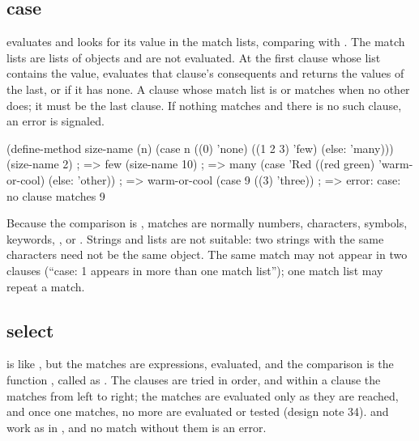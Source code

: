 \subsection{case}

\begin{quote}
\end{quote}

\noindent {} evaluates  and looks for its value in the
match lists, comparing with . The match lists are lists of
objects and are not evaluated. At the first clause whose list contains the
value,  evaluates that clause's consequents and returns the
values of the last, or  if it has none. A clause whose match list
is  or  matches when no other does; it must be the last
clause. If nothing matches and there is no such clause, an error is
signaled.

\begin{dylan}
(define-method size-name (n)
  (case n
    ((0) 'none)
    ((1 2 3) 'few)
    (else: 'many)))
(size-name 2)            ; => few
(size-name 10)           ; => many
(case 'Red ((red green) 'warm-or-cool) (else: 'other))   ; => warm-or-cool
(case 9 ((3) 'three))    ; => error: case: no clause matches 9
\end{dylan}

\noindent Because the comparison is , matches are normally
numbers, characters, symbols, keywords, ,  or
\code{()}. Strings and lists are not suitable: two strings with the same
characters need not be the same object. The same match may not appear in
two clauses (``case: 1 appears in more than one match list''); one match
list may repeat a match.

\subsection{select}

\begin{quote}
\end{quote}

\noindent {} is like , but the matches are expressions,
evaluated, and the comparison is the function , called as
. The clauses are tried
in order, and within a clause the matches from left to right; the matches
are evaluated only as they are reached, and once one matches, no more are
evaluated or tested (design note 34).  and  work as in
, and no match without them is an error.

